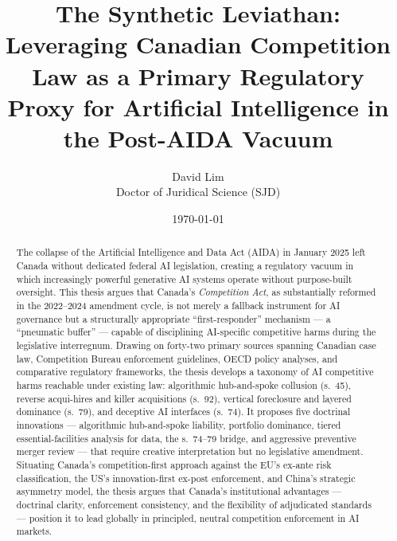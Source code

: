 \documentclass[12pt, letterpaper]{article}
\begin{document}
\title{The Synthetic Leviathan: Leveraging Canadian Competition Law as a Primary Regulatory Proxy for Artificial Intelligence in the Post-AIDA Vacuum}
\author{David Lim\\[0.5em]\normalsize Doctor of Juridical Science (SJD)}
\date{\today}
\maketitle
\thispagestyle{empty}  %

\onehalfspacing  %


\begin{abstract}
\noindent The collapse of the Artificial Intelligence and Data Act (AIDA) in January 2025 left Canada without dedicated federal AI legislation, creating a regulatory vacuum in which increasingly powerful generative AI systems operate without purpose-built oversight. This thesis argues that Canada's \textit{Competition Act}, as substantially reformed in the 2022--2024 amendment cycle, is not merely a fallback instrument for AI governance but a structurally appropriate ``first-responder'' mechanism --- a ``pneumatic buffer'' --- capable of disciplining AI-specific competitive harms during the legislative interregnum. Drawing on forty-two primary sources spanning Canadian case law, Competition Bureau enforcement guidelines, OECD policy analyses, and comparative regulatory frameworks, the thesis develops a taxonomy of AI competitive harms reachable under existing law: algorithmic hub-and-spoke collusion (s.~45), reverse acqui-hires and killer acquisitions (s.~92), vertical foreclosure and layered dominance (s.~79), and deceptive AI interfaces (s.~74). It proposes five doctrinal innovations --- algorithmic hub-and-spoke liability, portfolio dominance, tiered essential-facilities analysis for data, the s.~74--79 bridge, and aggressive preventive merger review --- that require creative interpretation but no legislative amendment. Situating Canada's competition-first approach against the EU's ex-ante risk classification, the US's innovation-first ex-post enforcement, and China's strategic asymmetry model, the thesis argues that Canada's institutional advantages --- doctrinal clarity, enforcement consistency, and the flexibility of adjudicated standards --- position it to lead globally in principled, neutral competition enforcement in AI markets.
\end{abstract}
\end{document}
